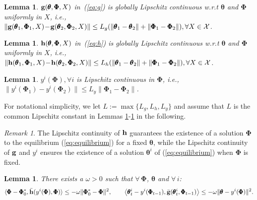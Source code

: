 \documentclass{article} %
\def\eqref#1{equation~\ref{#1}}
\theoremstyle{plain}
\newtheorem{lemma}[theorem]{Lemma}
\theoremstyle{definition}
\theoremstyle{remark}
\newtheorem{remark}[theorem]{Remark}
\renewcommand{\eqref}[1]{(\ref{#1})}
\newcommand{\cX}{\mathcal{X}}
\begin{document}
\begin{lemma}\label{Assumption:g_lipschitz}
${\mathbf{g}}(\pmb{\theta}, \pmb{\Phi}, X)$ in~(\ref{eq:g}) is globally Lipschitz continuous w.r.t $\pmb{\theta}$ and $\pmb{\Phi}$ uniformly in $X$, i.e., $\|\bg(\pmb{\theta}_1,\pmb{\Phi}_1, X)\!-\!\bg(\pmb{\theta}_2,\pmb{\Phi}_2, X)\|\leq L_g(\|\pmb{\theta}_1-\pmb{\theta}_2\|+\|\pmb{\Phi}_1-\pmb{\Phi}_2\|), \forall X\in\cX$.  
\end{lemma}



\begin{lemma}\label{Assumption:h_lipschitz}
$\mathbf{h}(\pmb{\theta}, \pmb{\Phi}, X)$ in~(\ref{eq:h}) is globally Lipschitz continuous w.r.t $\pmb{\theta}$ and $\pmb{\Phi}$ uniformly in $X$, i.e., $\|\bh(\pmb{\theta}_1,\pmb{\Phi}_1, X)\!-\!\bh(\pmb{\theta}_2,\pmb{\Phi}_2, X)\|\leq L_h(\|\pmb{\theta}_1-\pmb{\theta}_2\|+\|\pmb{\Phi}_1-\pmb{\Phi}_2\|), \forall X\in\cX$.  
\end{lemma} 



\begin{lemma}
    \label{Assumption:y_lipschitz}
$y^i(\pmb{\Phi}), \forall i$  is  Lipschitz continuous in ${\pmb{\Phi}}$, i.e., $\|y^i(\pmb{\Phi}_1)-y^i(\pmb{\Phi}_2)\|\leq L_y\|\pmb{\Phi}_1-\pmb{\Phi}_2\|$.
\end{lemma}
 
For notational simplicity, we let $L:=\max\{L_g, L_h, L_y\}$ and assume that $L$ is the common Lipschitz constant in Lemmas \ref{Assumption:g_lipschitz}-\ref{Assumption:y_lipschitz} in the following. 
\begin{remark}
The Lipschitz continuity of $\mathbf{h}$ guarantees the existence of a solution $\pmb{\Phi}$ to the equilibrium \eqref{eq:equilibrium} for a fixed $\pmb{\theta}$, while the  Lipschitz continuity of ${\mathbf{g}}$ and $y^i$ ensures the existence of a solution $\pmb{\theta}^i$ of \eqref{eq:equilibrium} when $\pmb{\Phi}$ is fixed.  
\end{remark}



 

\begin{lemma}\label{lem:gh_monotone}
      There exists a $\omega > 0$ such that $\forall \, \pmb{\Phi}$, $\pmb{\theta}$ and $\forall \, i$:
    \begin{align*}
        \langle\pmb{\Phi}-\pmb{\Phi}_0^*, \bar{\mathbf{h}}(y^i(\pmb{\Phi}), \pmb{\Phi})\rangle\leq -\omega\|\pmb{\Phi}_0^*-\pmb{\Phi}\|^2,\qquad
        \left\langle\pmb{\theta}_{t}^i-y^i(\pmb{\Phi}_{t-1}), \bar{{\mathbf{g}}}(\pmb{\theta}_{t}^i,\pmb{\Phi}_{t-1})\right\rangle\leq -\omega\|\pmb{\theta}-y^i(\pmb{\Phi})\|^2.
    \end{align*}

\end{lemma}
\end{document}
